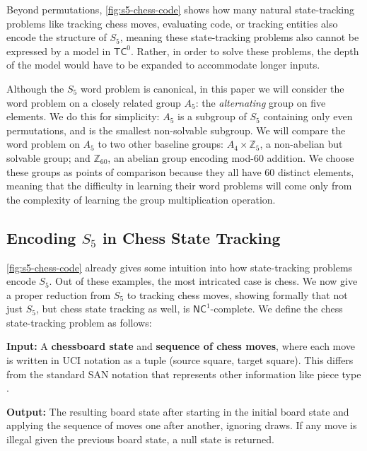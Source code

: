 Beyond permutations, \ref{fig:s5-chess-code} shows how many natural state-tracking problems like tracking chess moves, evaluating code, or tracking entities also encode the structure of $S_5$, meaning these state-tracking problems also cannot be expressed by a model in $\mathsf{TC}^0$. Rather, in order to solve these problems, the depth of the model would have to be expanded to accommodate longer inputs.

Although the $S_5$ word problem is canonical, in this paper we will consider the word problem on a closely related group $A_5$: the \emph{alternating} group on five elements. We do this for simplicity: $A_5$ is a subgroup of $S_5$ containing only even permutations, and is the smallest non-solvable subgroup. We will compare the word problem on $A_5$ to two other baseline groups: $A_4 \times \mathbb{Z}_5$, a non-abelian but solvable group; and $\mathbb{Z}_{60}$, an abelian group encoding mod-$60$ addition. We choose these groups as points of comparison because they all have $60$ distinct elements, meaning that the difficulty in learning their word problems will come only from the complexity of learning the group multiplication operation.

\subsection{Encoding $S_5$ in Chess State Tracking} \label{sec:chess}

\ref{fig:s5-chess-code} already gives some intuition into how state-tracking problems encode $S_5$. Out of these examples, the most intricated case is chess. We now give a proper reduction from $S_5$ to tracking chess moves, showing formally that not just $S_5$, but chess state tracking as well, is $\mathsf{NC}^1$-complete.
We define the chess state-tracking problem as follows:

\begin{compactitem}
    \item \textbf{Input:} A \textbf{chessboard state} and \textbf{sequence of chess moves}, where each move is written in UCI notation as a tuple (source square, target square). This differs from the standard SAN notation that represents other information like piece type \citep{Toshniwal2021ChessAA}.
    \item \textbf{Output:} The resulting board state after starting in the initial board state and applying the sequence of moves one after another, ignoring draws. If any move is illegal given the previous board state, a null state is returned.
\end{compactitem}

